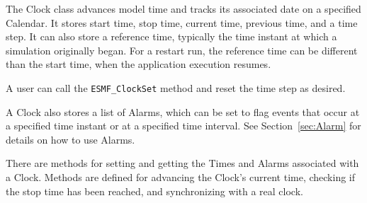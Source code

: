 
\label{sec:Clock}

The Clock class advances model time and tracks its associated
date on a specified Calendar.  It stores start time, stop time,
current time, previous time, and a time step.  It can also store
a reference time, typically the time instant at which a simulation 
originally began.  For a restart run, the reference time can be 
different than the start time, when the application execution resumes.

A user can call the {\tt ESMF\_ClockSet} method and reset the time 
step as desired.  

A Clock also stores a list of Alarms, which can be set to flag 
events that occur at a specified time instant or at 
a specified time interval.  See Section~\ref{sec:Alarm} for 
details on how to use Alarms.

There are methods for setting and getting the Times and 
Alarms associated with a Clock.  Methods are defined for 
advancing the Clock's current time, checking if the
stop time has been reached, and synchronizing with a real clock. 

